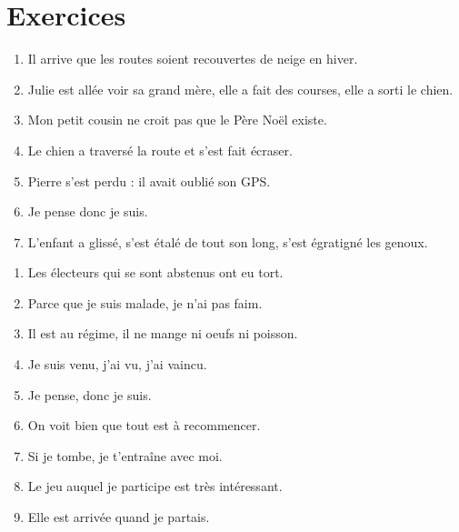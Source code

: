 \section*{Exercices}
\begin{keybox}
\begin{enumerate}[label=\arabic*.,leftmargin=1.6em]
\item Il arrive que les routes soient recouvertes de neige en hiver.
\item Julie est allée voir sa grand mère, elle a fait des courses, elle a sorti le chien.
\item Mon petit cousin ne croit pas que le Père Noël existe.
\item Le chien a traversé la route et s’est fait écraser.
\item Pierre s’est perdu : il avait oublié son GPS.
\item Je pense donc je suis.
\item L’enfant a glissé, s’est étalé de tout son long, s’est égratigné les genoux.
\end{enumerate}
\end{keybox}
\begin{keybox}
\begin{enumerate}[label=\arabic*.,start=8,leftmargin=1.6em]
\item Les électeurs qui se sont abstenus ont eu tort.
\item Parce que je suis malade, je n’ai pas faim.
\item Il est au régime, il ne mange ni oeufs ni poisson.
\item Je suis venu, j’ai vu, j’ai vaincu.
\item Je pense, donc je suis.
\item On voit bien que tout est à recommencer.
\item Si je tombe, je t’entraîne avec moi.
\item Le jeu auquel je participe est très intéressant.
\item Elle est arrivée quand je partais.
\end{enumerate}
\end{keybox}

